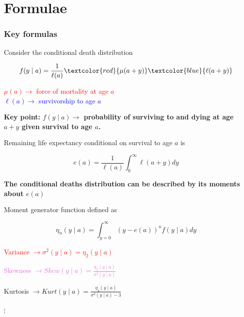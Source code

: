 \documentclass[xcolor={dvipsnames}]{beamer}
\begin{document}
\section{Formulae}

\begin{frame}\frametitle{Key formulas}
\large{
Consider the conditional death distribution

\begin{equation*}
f(y \mid a)= \frac{1}{\ell (a)} \textcolor{red}{\mu (a + y)} \textcolor{blue}{\ell (a + y)}
\end{equation*}
\pause

\textcolor{red}{$\mu(a)\longrightarrow $ force of mortality at age $a$} \\
\textcolor{blue}{$\ell (a)\longrightarrow $ survivorship to age $a$}
\linebreak

\pause

\textbf{Key point: $f(y \mid a) \longrightarrow $ probability of surviving to and dying at age 
$a+y$ given survival to age $a$.}}

\end{frame}

\begin{frame}
\large{
Remaining life expectancy conditional on survival to age $a$ is 

\begin{equation*}
e(a)= \frac{1}{\ell (a)} \int_0^\infty \ell (a + y)dy
\end{equation*}
\linebreak

\textbf{The conditional deaths distribution can be described by its moments about $e(a)$}}
\end{frame}


\begin{frame}
\large{
Moment generator function defined as

\begin{equation*}
\eta_n(y \mid a) = \int_{y=0}^\infty (y - e(a))^n f(y \mid a) dy
\end{equation*}
\linebreak

\pause
\textcolor{red} {Variance $\longrightarrow \sigma^2(y \mid a) = \eta_2(y \mid a)$ }
\linebreak

\pause
\textcolor{Orchid} {Skewness $\longrightarrow Skew(y \mid a) = \frac{ \eta_3(y \mid a)}{\sigma^2(y \mid a)} $ }
\linebreak

\pause
\textcolor{NavyBlue} {Kurtosis $\longrightarrow Kurt(y \mid a) = \frac{ \eta_4(y \mid a)}{\sigma^3(y \mid a) - 3} $ }}


\begin{center}
$\vdots$
\end{center} 

\end{frame}
\end{document}
